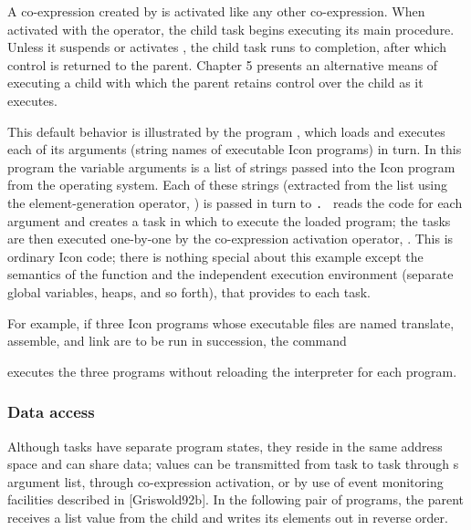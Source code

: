A co-expression created by  is
activated like any other co-expression. When activated with the
 operator, the child task begins
executing its main procedure. Unless it suspends or activates
, the child task runs to
completion, after which control is returned to the parent. Chapter 5
presents an alternative means of executing a child with which the
parent retains control over the child as it executes. 

This default behavior is illustrated by the program
, which loads and executes each
of its arguments (string names of executable Icon programs) in turn. In
this program the variable arguments is a list of strings passed into
the Icon program from the operating system. Each of these strings
(extracted from the list using the element-generation operator,
\textstyleSourceText{\texttt{!}}) is passed in turn to
\texttt{.
} reads the code for each argument
and creates a task in which to execute the loaded program; the tasks
are then executed one-by-one by the co-expression activation operator,
. This is ordinary Icon code; there is
nothing special about this example except the semantics of the
 function and the independent
execution environment (separate global variables, heaps, and so forth),
that \textstyleSourceText{
}provides to each task. 


For example, if three Icon programs whose executable files are named
translate, assemble, and link are to be run in succession, the command 


\noindent
executes the three programs without reloading the interpreter for each
program. 

\subsubsection{Data access}

Although tasks have separate program states, they reside in the same
address space and can share data; values can be transmitted from task
to task through
s argument list,
through co-expression activation, or by use of event monitoring
facilities described in [Griswold92b]. In the following pair of
programs, the parent receives a list value from the child and writes
its elements out in reverse order. 

